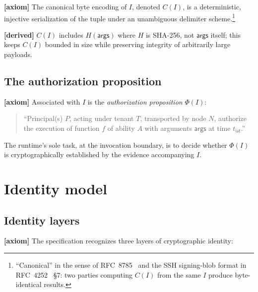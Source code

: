 \documentclass[11pt,a4paper]{article}
\newcommand{\axiom}{\textcolor{axiomcolor}{\textbf{[axiom]}}\xspace}
\newcommand{\derived}{\textcolor{derivedcolor}{\textbf{[derived]}}\xspace}
\begin{document}
\axiom{} The canonical byte encoding of $I$, denoted $C(I)$, is a
deterministic, injective serialization of the tuple under an
unambiguous delimiter scheme.\footnote{``Canonical'' in the sense of
RFC~8785~\cite{rfc8785} and the SSH signing-blob format in
RFC~4252~\cite{rfc4252} \S7: two parties computing $C(I)$ from the same
$I$ produce byte-identical results.}

\derived{} $C(I)$ includes $H(\mathsf{args})$ where $H$ is SHA-256, not
$\mathsf{args}$ itself; this keeps $C(I)$ bounded in size while
preserving integrity of arbitrarily large payloads.

\subsection{The authorization proposition}

\axiom{} Associated with $I$ is the \emph{authorization proposition}
$\Phi(I)$:

\begin{quote}
``Principal(s) $P$, acting under tenant $T$, transported by node $N$,
authorize the execution of function $f$ of ability $A$ with arguments
$\mathsf{args}$ at time $t_{\mathsf{iat}}$.''
\end{quote}

The runtime's sole task, at the invocation boundary, is to decide
whether $\Phi(I)$ is cryptographically established by the evidence
accompanying $I$.

\section{Identity model}
\label{sec:identity}

\subsection{Identity layers}

\axiom{} The specification recognizes three layers of cryptographic
identity:
\end{document}
